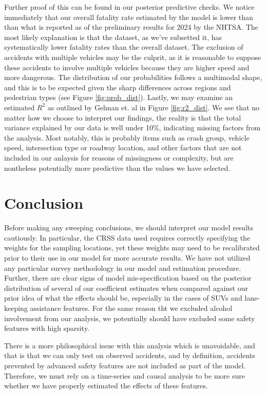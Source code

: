 \documentclass[12pt]{article}
\begin{document}
Further proof of this can be found in our posterior predictive checks. We notice immediately that our overall fatality
rate estimated by the model is lower than than what is reported as of the preliminary results for 2024 by the NHTSA. 
The most likely explanation is that the dataset, as we've subsetted
it, has systematically lower fatality rates than the overall dataset. The exclusion of accidents
with multiple vehicles may be the culprit, as it is reasonable to suppose these accidents to involve
multiple vehicles because they are higher speed and more dangerous. The distribution of our probabilities follows
a multimodal shape, and this is to be expected given the sharp differences across regions
and pedestrian types (see Figure \ref{fig:prob_dist}). Lastly, we may examine an estimated $R^2$ as outlined by
Gelman et. al\cite{gelman_r-squared_2019} in Figure \ref{fig:r2_dist}. We see that no matter how we choose to interpret
our findings, the reality is that the total variance explained by our data is well under 10\%, indicating missing factors
from the analysis. Most notably, this is probably items such as crash group, vehicle
speed, intersection type or roadway location, and other factors that are not included in our anlaysis for reasons
of missingness or complexity, but are nontheless potentially more predictive than the values we have selected.

\section{Conclusion}

Before making any sweeping conclusions, we should interpret our model results cautiously. In particular, the CRSS
data used requires correctly specifying the weights for the sampling locations, yet these weights may need to be
recalibrated prior to their use in our model for more accurate results. We have not utilized any particular
survey methodology in our model and estimation procedure. Further, there are clear signs of model mis-specification
based on the posterior distribution of several of our coefficient estimates when compared against our prior idea of what
the effects should be, especially in the cases of SUVs and lane-keeping assistance features. For the same reason tht we
excluded alcohol involvement from our analysis, we potentially should have excluded some safety features with high 
sparsity.

There is a more philosophical issue with this analysis which is unavoidable, and that is that we can only test on 
observed accidents, and by definition, accidents prevented by advanced safety features are not included
as part of the model. Therefore, we must rely on a time-series and causal analysis to be more
sure whether we have properly estimated the effects of these features.
\end{document}

